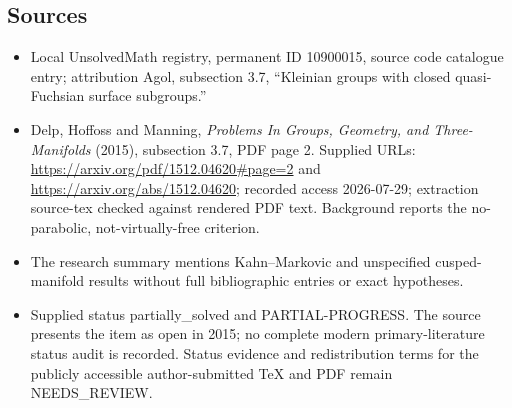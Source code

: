 \documentclass[11pt]{article}
\begin{document}
\subsection{Sources}
\begin{itemize}
\item Local UnsolvedMath registry, permanent ID 10900015, source code catalogue entry; attribution Agol, subsection 3.7, ``Kleinian groups with closed quasi-Fuchsian surface subgroups.''
\item Delp, Hoffoss and Manning, \emph{Problems In Groups, Geometry, and Three-Manifolds} (2015), subsection 3.7, PDF page 2. Supplied URLs: \url{https://arxiv.org/pdf/1512.04620#page=2} and \url{https://arxiv.org/abs/1512.04620}; recorded access 2026-07-29; extraction source-tex checked against rendered PDF text. Background reports the no-parabolic, not-virtually-free criterion.
\item The research summary mentions Kahn--Markovic and unspecified cusped-manifold results without full bibliographic entries or exact hypotheses.
\item Supplied status partially\_solved and PARTIAL-PROGRESS. The source presents the item as open in 2015; no complete modern primary-literature status audit is recorded. Status evidence and redistribution terms for the publicly accessible author-submitted TeX and PDF remain NEEDS\_REVIEW.
\end{itemize}
\end{document}

